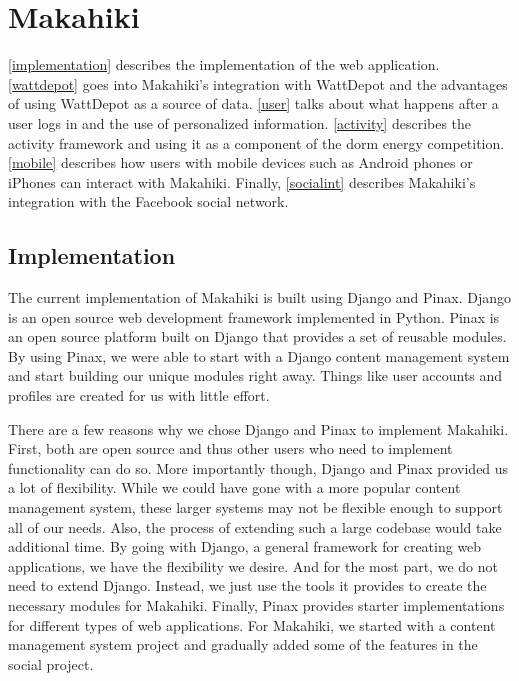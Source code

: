 \chapter{Makahiki}
\label{makahiki}

\autoref{implementation} describes the implementation of the web application.  \autoref{wattdepot} goes into Makahiki's integration with WattDepot and the advantages of using WattDepot as a source of data.  \autoref{user} talks about what happens after a user logs in and the use of personalized information.  \autoref{activity} describes the activity framework and using it as a component of the dorm energy competition.  \autoref{mobile} describes how users with mobile devices such as Android phones or iPhones can interact with Makahiki. Finally, \autoref{socialint} describes Makahiki's integration with the Facebook social network.

\section{Implementation}
\label{implementation}

The current implementation of Makahiki is built using Django and Pinax.  Django\cite{django} is an open source web development framework implemented in Python.  Pinax\cite{pinax} is an open source platform built on Django that provides a set of reusable modules.  By using Pinax, we were able to start with a Django content management system and start building our unique modules right away.  Things like user accounts and profiles are created for us with little effort.

There are a few reasons why we chose Django and Pinax to implement Makahiki.  First, both are open source and thus other users who need to implement functionality can do so.  More importantly though, Django and Pinax provided us a lot of flexibility.  While we could have gone with a more popular content management system, these larger systems may not be flexible enough to support all of our needs.  Also, the process of extending such a large codebase would take additional time.  By going with Django, a general framework for creating web applications, we have the flexibility we desire.  And for the most part, we do not need to extend Django.  Instead, we just use the tools it provides to create the necessary modules for Makahiki.  Finally, Pinax provides starter implementations for different types of web applications.  For Makahiki, we started with a content management system project and gradually added some of the features in the social project.

